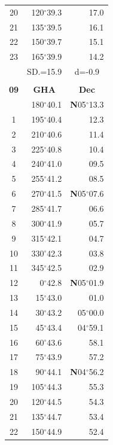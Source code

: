 \documentclass[10pt, a4paper]{report}
\begin{document}
\begin{scriptsize}
\begin{tabular*}{0.2\textwidth}[t]{@{\extracolsep{\fill}}|c|rr|}
20 & 120$^\circ$39.3 & 17.0\\
21 & 135$^\circ$39.5 & \raisebox{0.24ex}{\boldmath$\cdot$~\boldmath$\cdot$~~}16.1\\
22 & 150$^\circ$39.7 & 15.1\\
23 & 165$^\circ$39.9 & 14.2\\
\hline
\rule{0pt}{2.4ex} & \multicolumn{1}{c}{SD.=15.9} & \multicolumn{1}{c|}{d=-0.9}\\
\hline
\multicolumn{1}{c}{}\\[-0.5ex]\hline
\multicolumn{1}{|c|}{\rule{0pt}{2.6ex}\textbf{09}} & \multicolumn{1}{c}{\textbf{GHA}} & \multicolumn{1}{c|}{\textbf{Dec}}\\
\hline\rule{0pt}{2.6ex}\noindent
0 & 180$^\circ$40.1 & \textbf{N}05$^\circ$13.3\\
1 & 195$^\circ$40.4 & 12.3\\
2 & 210$^\circ$40.6 & 11.4\\
3 & 225$^\circ$40.8 & \raisebox{0.24ex}{\boldmath$\cdot$~\boldmath$\cdot$~~}10.4\\
4 & 240$^\circ$41.0 & 09.5\\
5 & 255$^\circ$41.2 & 08.5\\[2Pt]
6 & 270$^\circ$41.5 & \textbf{N}05$^\circ$07.6\\
7 & 285$^\circ$41.7 & 06.6\\
8 & 300$^\circ$41.9 & 05.7\\
9 & 315$^\circ$42.1 & \raisebox{0.24ex}{\boldmath$\cdot$~\boldmath$\cdot$~~}04.7\\
10 & 330$^\circ$42.3 & 03.8\\
11 & 345$^\circ$42.5 & 02.9\\[2Pt]
12 & 0$^\circ$42.8 & \textbf{N}05$^\circ$01.9\\
13 & 15$^\circ$43.0 & 01.0\\
14 & 30$^\circ$43.2 & 05$^\circ$00.0\\
15 & 45$^\circ$43.4 & 04$^\circ$59.1\\
16 & 60$^\circ$43.6 & 58.1\\
17 & 75$^\circ$43.9 & 57.2\\[2Pt]
18 & 90$^\circ$44.1 & \textbf{N}04$^\circ$56.2\\
19 & 105$^\circ$44.3 & 55.3\\
20 & 120$^\circ$44.5 & 54.3\\
21 & 135$^\circ$44.7 & \raisebox{0.24ex}{\boldmath$\cdot$~\boldmath$\cdot$~~}53.4\\
22 & 150$^\circ$44.9 & 52.4\\

\end{tabular*}
\end{scriptsize}
\end{document}
